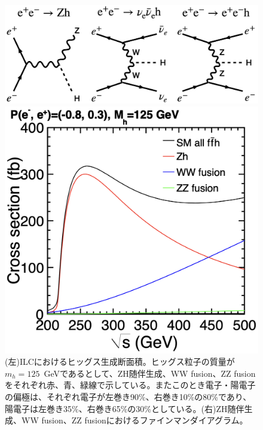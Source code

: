\begin{figure}[h]
 \begin{minipage}[h]{.45\linewidth}
 \includegraphics[keepaspectratio, scale=0.18]
 	{Figure/Introduction/higgs_cs_feynman.png}
\end{minipage}
\hfill
 \begin{minipage}[h]{.45\linewidth}
 \includegraphics[keepaspectratio, scale=0.25]
 	{Figure/Introduction/higgs_cross_section.png}
\end{minipage}
\label{higgs_cs}
\caption{(左)ILCにおけるヒッグス生成断面積。ヒッグス粒子の質量が$m_h=125$\ GeVであるとして、ZH随伴生成、WW fusion、ZZ fusionをそれぞれ赤、青、緑線で示している。またこのとき電子・陽電子の偏極は、それぞれ電子が左巻き90\%、右巻き10\%の80\%であり、陽電子は左巻き35\%、右巻き65\%の30\%としている。(右)ZH随伴生成、WW fusion、ZZ fusionにおけるファインマンダイアグラム。}
\end{figure}
